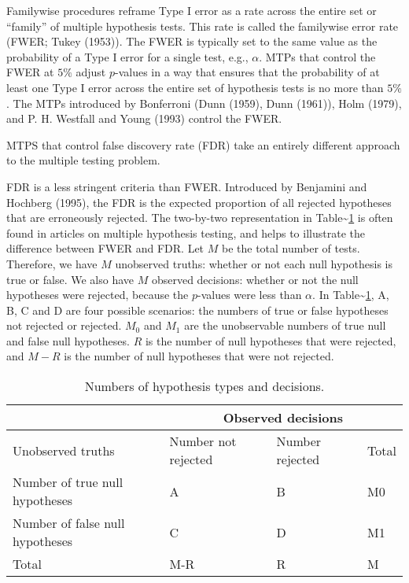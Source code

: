 \documentclass[
]{article}
\begin{document}
Familywise procedures reframe Type I error as a rate across the entire
set or ``family'' of multiple hypothesis tests. This rate is called the
familywise error rate (FWER; Tukey (1953)). The FWER is typically set to
the same value as the probability of a Type I error for a single test,
e.g., \(\alpha\). MTPs that control the FWER at \(5\%\) adjust
\(p\)-values in a way that ensures that the probability of at least one
Type I error across the entire set of hypothesis tests is no more than
\(5\%\). The MTPs introduced by Bonferroni (Dunn (1959), Dunn (1961)),
Holm (1979), and P. H. Westfall and Young (1993) control the FWER.

MTPS that control false discovery rate (FDR) take an entirely different
approach to the multiple testing problem.

FDR is a less stringent criteria than FWER. Introduced by Benjamini and
Hochberg (1995), the FDR is the expected proportion of all rejected
hypotheses that are erroneously rejected. The two-by-two representation
in Table\textasciitilde{}\ref{tab:twobytwo} is often found in articles
on multiple hypothesis testing, and helps to illustrate the difference
between FWER and FDR. Let \(M\) be the total number of tests. Therefore,
we have \(M\) unobserved truths: whether or not each null hypothesis is
true or false. We also have \(M\) observed decisions: whether or not the
null hypotheses were rejected, because the \(p\)-values were less than
\(\alpha\). In Table\textasciitilde{}\ref{tab:twobytwo}, A, B, C and D
are four possible scenarios: the numbers of true or false hypotheses not
rejected or rejected. \(M_0\) and \(M_1\) are the unobservable numbers
of true null and false null hypotheses. \(R\) is the number of null
hypotheses that were rejected, and \(M - R\) is the number of null
hypotheses that were not rejected.

\begin{table}[h!]
\centering
\begin{tabular}{l l l l}
                                      & \multicolumn{3}{c}{Observed decisions}\\ \hline
Unobserved truths                     & Number not rejected     & Number rejected   & Total \\ \hline
Number of true null hypotheses        & A                       & B                 & M0 \\
Number of false null hypotheses       & C                       & D                 & M1 \\ \hline
Total                                 & M-R                     & R                 & M
\end{tabular}
\caption{Numbers of hypothesis types and decisions.}
  \label{tab:twobytwo}
\end{table}
\end{document}
